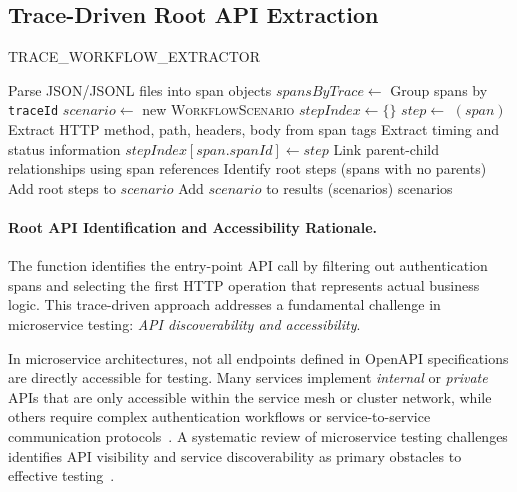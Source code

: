 \documentclass[conference]{IEEEtran}
\begin{document}
\subsection{Trace-Driven Root API Extraction}
\label{ssec:extract}
\begin{algorithm}[tb]
\caption{TRACE\_WORKFLOW\_EXTRACTOR}\label{alg:extract}
\footnotesize
\begin{algorithmic}[1]
\Require{}
\Ensure{}
\State Parse JSON/JSONL files into span objects
\State $spansByTrace \gets$ Group spans by \texttt{traceId}
    \State $scenario \gets$ new \textsc{WorkflowScenario}
    \State $stepIndex \gets \{\}$ 
        \State $step \gets$ $(span)$
        \State Extract HTTP method, path, headers, body from span tags
        \State Extract timing and status information
        \State $stepIndex[span.spanId] \gets step$
    \EndFor
    \State Link parent-child relationships using span references
    \State Identify root steps (spans with no parents)
    \State Add root steps to $scenario$
    \State Add $scenario$ to results
\EndFor
\State {}(scenarios)
\State \Return scenarios
\end{algorithmic}
\end{algorithm}

\paragraph{Root API Identification and Accessibility Rationale.}
The  function identifies the entry-point API call by filtering out authentication spans and selecting the first HTTP operation that represents actual business logic. This trace-driven approach addresses a fundamental challenge in microservice testing: \emph{API discoverability and accessibility}.

In microservice architectures, not all endpoints defined in OpenAPI specifications are directly accessible for testing. Many services implement \emph{internal} or \emph{private} APIs that are only accessible within the service mesh or cluster network, while others require complex authentication workflows or service-to-service communication protocols~\cite{waseem2020testing, zhou2018microservice}. A systematic review of microservice testing challenges identifies API visibility and service discoverability as primary obstacles to effective testing~\cite{microservice-testing-review-2023}.
\end{document}
